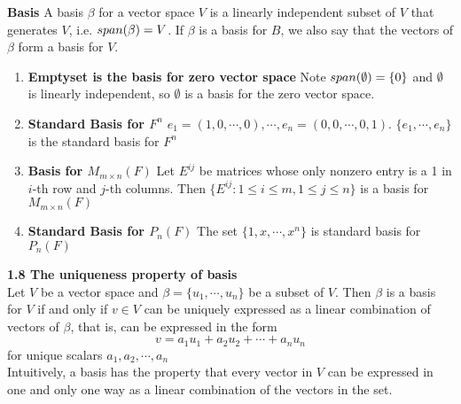 \documentclass[11pt]{article}
\begin{document}

\begin{defn*}
    \textbf{Basis} A basis $\beta$ for a vector space $V$ is a linearly independent subset of $V$ that generates $V$, i.e. $span(\beta) = V$. If $\beta$ is a basis for $B$, we also say that the vectors of $\beta$ form a basis for $V$. 
    \begin{enumerate}
        \item \textbf{Emptyset is the basis for zero vector space} Note $span(\emptyset)=\{0\}$ and $\emptyset$ is linearly independent, so $\emptyset$ is a basis for the zero vector space. 
        \item \textbf{Standard Basis for $F^n$} $e_1 = (1,0,\cdots, 0), \cdots, e_n= (0,0,\cdots, 0,1)$. $\{e_1, \cdots, e_n\}$ is the standard basis for $F^n$
        \item \textbf{Basis for $M_{m\times n}(F)$} Let $E^{ij}$ be matrices whose only nonzero entry is a 1 in $i$-th row and $j$-th columns. Then $\{E^{ij}: 1\leq i \leq m, 1\leq j \leq n\}$ is a basis for $M_{m\times n}(F)$
        \item \textbf{Standard Basis for $P_n(F)$} The set $\{1,x,\cdots, x^n\}$ is standard basis for $P_n(F)$
    \end{enumerate}
\end{defn*}

\begin{theorem*}
    \textbf{1.8 The uniqueness property of basis} \\  
    Let $V$ be a vector space and $\beta = \{u_1, \cdots, u_n \}$ be a subset of $V$. Then $\beta$ is a basis for $V$ if and only if $v\in V$ can be uniquely expressed as a linear combination of vectors of $\beta$, that is, can be expressed in the form 
    \[
        v = a_1 u_1 + a_2 u_2 + \cdots + a_n u_n    
    \]
    for unique scalars $a_1, a_2, \cdots, a_n$ \\
    Intuitively, a basis has the property that every vector in $V$ can be expressed in one and only one way as a linear combination of the vectors in the set. 
\end{theorem*} 
\end{document}
